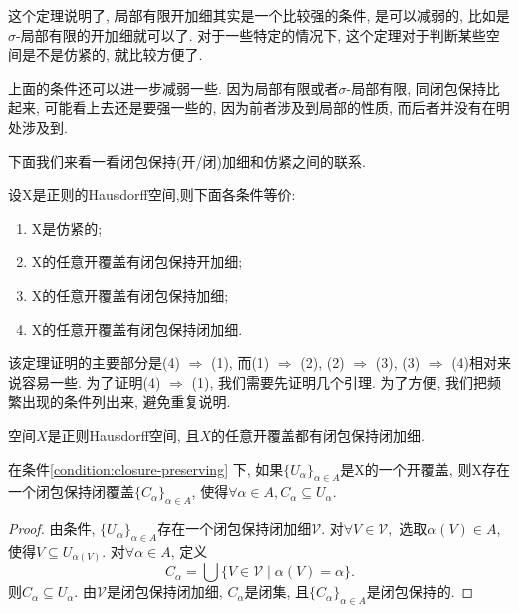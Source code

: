 这个定理说明了, 局部有限开加细其实是一个比较强的条件, 是可以减弱的,
比如是$\sigma$-局部有限的开加细就可以了. 对于一些特定的情况下,
这个定理对于判断某些空间是不是仿紧的, 就比较方便了.

上面的条件还可以进一步减弱一些. 因为局部有限或者$\sigma$-局部有限,
同闭包保持比起来, 可能看上去还是要强一些的, 因为前者涉及到局部的性质,
而后者并没有在明处涉及到.

下面我们来看一看闭包保持(开/闭)加细和仿紧之间的联系.

\begin{thm} \label{thm:closure-preserving}
  设X是正则的Hausdorff空间,则下面各条件等价:
  \begin{enumerate}
  \item X是仿紧的;
  \item X的任意开覆盖有闭包保持开加细;
  \item X的任意开覆盖有闭包保持加细;
  \item X的任意开覆盖有闭包保持闭加细.
  \end{enumerate}
\end{thm}

该定理证明的主要部分是(4) $\Rightarrow$ (1), 而(1) $\Rightarrow$ (2),
(2) $\Rightarrow$ (3), (3) $\Rightarrow$ (4)相对来说容易一些.
为了证明(4) $\Rightarrow$ (1), 我们需要先证明几个引理.
为了方便, 我们把频繁出现的条件列出来, 避免重复说明.

\begin{condition} \label{condition:closure-preserving}
  空间$X$是正则Hausdorff空间, 且$X$的任意开覆盖都有闭包保持闭加细.
\end{condition}

\begin{lemma} \label{lemma:indexed closure-preserving}
  在条件\ref{condition:closure-preserving} 下,
  如果$\{ U_{\alpha} \}_{\alpha \in A}$是X的一个开覆盖,
  则X存在一个闭包保持闭覆盖$\{ C_{\alpha} \}_{\alpha \in A}$,
  使得$\forall \alpha \in A, C_{\alpha} \subseteq U_{\alpha}$.
\end{lemma}
\begin{proof}
  由条件, $\{ U_{\alpha} \}_{\alpha \in A}$存在一个闭包保持闭加细$\mathscr{V}$.
  对$\forall V \in \mathscr{V},$ 选取$\alpha(V) \in A$, 使得$V \subseteq U_{\alpha(V)}$.
  对$\forall \alpha \in A$, 定义
  \[
    C_{\alpha} = \bigcup \{ V \in \mathscr{V} \mid \alpha(V) = \alpha \}.
  \]
  则$C_{\alpha} \subseteq U_{\alpha}$. 由$\mathscr{V}$是闭包保持闭加细,
  $C_{\alpha}$是闭集, 且$\{ C_{\alpha} \}_{\alpha \in A}$是闭包保持的.
\end{proof}


